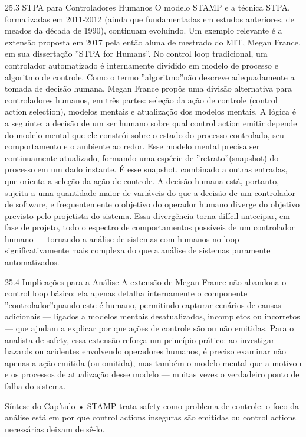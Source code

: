 25.3 STPA para Controladores Humanos O modelo STAMP e a técnica STPA, formalizadas em 2011-2012 (ainda que fundamentadas em estudos anteriores, de meados da década de 1990), continuam evoluindo. Um exemplo relevante é a extensão proposta em 2017 pela então aluna de mestrado do MIT, Megan France, em sua dissertação ”STPA for Humans”. No control loop tradicional, um controlador automatizado é internamente dividido em modelo de processo e algoritmo de controle. Como o termo ”algoritmo”não descreve adequadamente a tomada de decisão humana, Megan France propôs uma divisão alternativa para controladores humanos, em três partes: seleção da ação de controle (control action selection), modelos mentais e atualização dos modelos mentais. A lógica é a seguinte: a decisão de um ser humano sobre qual control action emitir depende do modelo mental que ele constrói sobre o estado do processo controlado, seu comportamento e o ambiente ao redor. Esse modelo mental precisa ser continuamente atualizado, formando uma espécie de ”retrato”(snapshot) do processo em um dado instante. É esse snapshot, combinado a outras entradas, que orienta a seleção da ação de controle. A decisão humana está, portanto, sujeita a uma quantidade maior de variáveis do que a decisão de um controlador de software, e frequentemente o objetivo do operador humano diverge do objetivo previsto pelo projetista do sistema. Essa divergência torna difícil antecipar, em fase de projeto, todo o espectro de comportamentos possíveis de um controlador humano — tornando a análise de sistemas com humanos no loop significativamente mais complexa do que a análise de sistemas puramente automatizados.

25.4 Implicações para a Análise A extensão de Megan France não abandona o control loop básico: ela apenas detalha internamente o componente ”controlador”quando este é humano, permitindo capturar cenários de causas adicionais — ligados a modelos mentais desatualizados, incompletos ou incorretos — que ajudam a explicar por que ações de controle são ou não emitidas. Para o analista de safety, essa extensão reforça um princípio prático: ao investigar hazards ou acidentes envolvendo operadores humanos, é preciso examinar não apenas a ação emitida (ou omitida), mas também o modelo mental que a motivou e os processos de atualização desse modelo — muitas vezes o verdadeiro ponto de falha do sistema.

Síntese do Capítulo • STAMP trata safety como problema de controle: o foco da análise está em por que control actions inseguras são emitidas ou control actions necessárias deixam de sê-lo.


